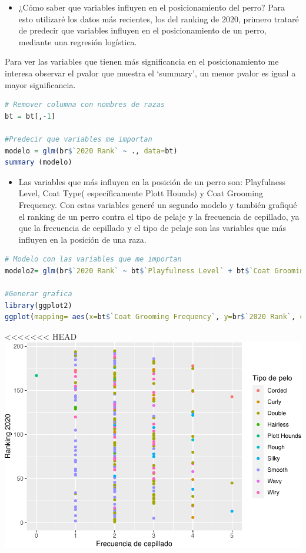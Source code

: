 \documentclass[
]{article}
\providecommand{\tightlist}{%
  \setlength{\itemsep}{0pt}\setlength{\parskip}{0pt}}
\begin{document}
\begin{itemize}
\tightlist
\item
  ¿Cómo saber que variables influyen en el posicionamiento del perro?
  Para esto utilizaré los datos más recientes, los del ranking de 2020,
  primero trataré de predecir que variables influyen en el
  posicionamiento de un perro, mediante una regresión logística.
\end{itemize}

Para ver las variables que tienen más significancia en el
posicionamiento me interesa observar el pvalor que muestra el `summary',
un menor pvalor es igual a mayor significancia.

\begin{lstlisting}[language=R]
# Remover columna con nombres de razas
bt = bt[,-1]

#Predecir que variables me importan
modelo = glm(br$`2020 Rank` ~ ., data=bt)
summary (modelo)
\end{lstlisting}

\begin{itemize}
\tightlist
\item
  Las variables que más influyen en la posición de un perro son:
  Playfulness Level, Coat Type( específicamente Plott Hounds) y Coat
  Grooming Frequency. Con estas variables generé un segundo modelo y
  también grafiqué el ranking de un perro contra el tipo de pelaje y la
  frecuencia de cepillado, ya que la frecuencia de cepillado y el tipo
  de pelaje son las variables que más influyen en la posición de una
  raza.
\end{itemize}

\begin{lstlisting}[language=R]
# Modelo con las variables que me importan
modelo2= glm(br$`2020 Rank` ~ bt$`Playfulness Level` + bt$`Coat Grooming Frequency` + bt$`Coat Type`)

#Generar grafica
library(ggplot2)
ggplot(mapping= aes(x=bt$`Coat Grooming Frequency`, y=br$`2020 Rank`, colour= bt$`Coat Type`))+ geom_point() + labs (y= "Ranking 2020", x = "Frecuencia de cepillado") + labs(color = "Tipo de pelo")
\end{lstlisting}

<<<<<<< HEAD
\includegraphics{Entrega04_files/figure-latex/unnamed-chunk-6-1.pdf}
\end{document}
